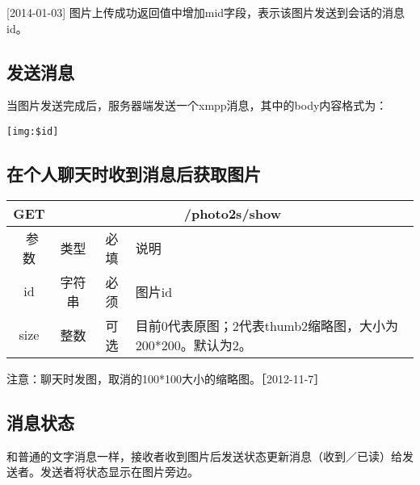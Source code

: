 [2014-01-03] 图片上传成功返回值中增加mid字段，表示该图片发送到会话的消息id。



\subsection{发送消息}
当图片发送完成后，服务器端发送一个xmpp消息，其中的body内容格式为：

\begin{verbatim}
[img:$id]

\end{verbatim}

\subsection{在个人聊天时收到消息后获取图片}
\begin{table}[H]
   \begin{center}
\begin{tabular}{|c|c|c|p{12cm}|}
\hline
GET & \multicolumn{3}{|c|}{/photo2s/show} \\
\hline\hline
 \  参数  & 类型 & 必填 &  说明  \\
  \hline
 id  & 字符串 & 必须 & 图片id\\
\hline
 size  & 整数 & 可选 &  目前0代表原图；2代表thumb2缩略图，大小为200*200。默认为2。\\ 
\hline
\end{tabular}
   \end{center}
\end{table}

注意：聊天时发图，取消的100*100大小的缩略图。［2012-11-7］


\subsection{消息状态}
和普通的文字消息一样，接收者收到图片后发送状态更新消息（收到／已读）给发送者。发送者将状态显示在图片旁边。


